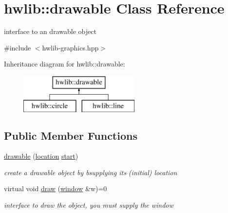 \hypertarget{classhwlib_1_1drawable}{}\section{hwlib\+:\+:drawable Class Reference}
\label{classhwlib_1_1drawable}


interface to an drawable object  




{\ttfamily \#include $<$hwlib-\/graphics.\+hpp$>$}

Inheritance diagram for hwlib\+:\+:drawable\+:\begin{figure}[H]
\begin{center}
\leavevmode
\includegraphics[height=2.000000cm]{classhwlib_1_1drawable}
\end{center}
\end{figure}
\subsection*{Public Member Functions}
\begin{DoxyCompactItemize}
\item 
\hyperlink{classhwlib_1_1drawable_a48f84ea64249fe67f726e9631d149d66}{drawable} (\hyperlink{classhwlib_1_1location}{location} \hyperlink{classhwlib_1_1drawable_a6c31bc9303840a4317d3c95250c357ce}{start})\hypertarget{classhwlib_1_1drawable_a48f84ea64249fe67f726e9631d149d66}{}\label{classhwlib_1_1drawable_a48f84ea64249fe67f726e9631d149d66}

\begin{DoxyCompactList}\small\item\em create a drawable object by bsupplying its (initial) location \end{DoxyCompactList}\item 
virtual void \hyperlink{classhwlib_1_1drawable_ac9ea0de52a14d9024cb34110f794ac28}{draw} (\hyperlink{classhwlib_1_1window}{window} \&w)=0\hypertarget{classhwlib_1_1drawable_ac9ea0de52a14d9024cb34110f794ac28}{}\label{classhwlib_1_1drawable_ac9ea0de52a14d9024cb34110f794ac28}

\begin{DoxyCompactList}\small\item\em interface to draw the object, you must supply the window \end{DoxyCompactList}\end{DoxyCompactItemize}
